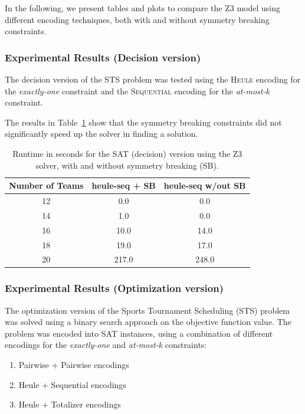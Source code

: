 In the following, we present tables and plots to compare the Z3 model using different encoding techniques, both with and without symmetry breaking constraints.

\subsubsection{Experimental Results (Decision version)}
The decision version of the STS problem was tested using the \textsc{Heule} encoding for the \textit{exactly-one} constraint and the \textsc{Sequential} encoding for the \textit{at-most-$k$} constraint.

The results in Table~\ref{tab:sat-results-dec} show that the symmetry breaking constraints did not significantly speed up the solver in finding a solution. 


\begin{table}[H]
\centering
\small %
\caption{Runtime in seconds for the SAT (decision) version using the Z3 solver, with and without symmetry breaking (SB).}
\label{tab:sat-results-dec}
\begin{tabular}{ccc}
\toprule
\textbf{Number of Teams} & \textbf{heule-seq + SB} & \textbf{heule-seq w/out SB} \\
\midrule
12 & 0.0 & 0.0 \\
14 & 1.0 & 0.0 \\
16 & 10.0 & 14.0 \\
18 & 19.0 & 17.0 \\
20 & 217.0 & 248.0 \\
\bottomrule
\end{tabular}
\end{table}

\subsubsection{Experimental Results (Optimization version)}
The optimization version of the Sports Tournament Scheduling (STS) problem was solved using a binary search approach on the objective function value. The problem was encoded into SAT instances, using a combination of different encodings for the \textit{exactly-one} and \textit{at-most-k} constraints:

\begin{enumerate}
\item Pairwise + Pairwise encodings
\item Heule + Sequential encodings
\item Heule + Totalizer encodings
\end{enumerate}

